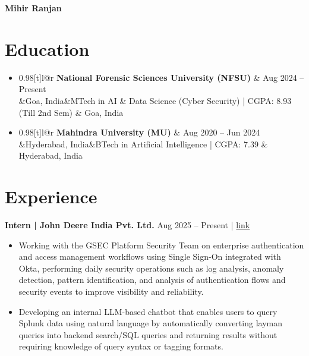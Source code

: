 \documentclass[a4paper,11pt]{article}
\makeatletter
\newcommand{\resumeSubheading}[4]{\vspace{0.5mm}\item
  \begin{tabular*}{0.98\textwidth}[t]{l@{\extracolsep{\fill}}r}
    \textbf{#1} & #4 \\
    \ifx&#2&\else #3 & #2 \\ \fi
  \end{tabular*}
  \vspace{-2mm}
}
\newcommand{\resumeSubHeadingListStart}{\begin{itemize}[leftmargin=*,labelsep=1mm,itemsep=0pt]}
\newcommand{\resumeItemListStart}{\begin{itemize}[leftmargin=*,labelsep=1mm,itemsep=0pt,topsep=2pt]}
\newcommand{\resumeSubHeadingListEnd}{\end{itemize}\vspace{1mm}}
\newcommand{\resumeItemListEnd}{\end{itemize}\vspace{1mm}}
\makeatother
\begin{document}
\begin{center}
    {\Huge\textbf{Mihir Ranjan}}
\end{center}

\begin{center}
\normalsize
{}
\end{center}


\section{\textbf{Education}}
\resumeSubHeadingListStart
\resumeSubheading
{National Forensic Sciences University (NFSU)}{Goa, India}
{MTech in AI \& Data Science (Cyber Security) | CGPA: 8.93 (Till 2nd Sem)}{Aug 2024 -- Present}
\resumeSubheading
{Mahindra University (MU)}{Hyderabad, India}
{BTech in Artificial Intelligence | CGPA: 7.39}{Aug 2020 -- Jun 2024}
\resumeSubHeadingListEnd


\section{\textbf{Experience}}

\textbf{Intern | John Deere India Pvt. Ltd.} \hfill Aug 2025 -- Present |
\href{https://drive.google.com/file/d/1NGKccMNJ6PCJyySXnh-hhefYy7hMsqMX/view?usp=sharing}{link}
\resumeItemListStart
\item Working with the GSEC Platform Security Team on enterprise authentication and access management workflows using Single Sign-On integrated with Okta, performing daily security operations such as log analysis, anomaly detection, pattern identification, and analysis of authentication flows and security events to improve visibility and reliability.
\item Developing an internal LLM-based chatbot that enables users to query Splunk data using natural language by automatically converting layman queries into backend search/SQL queries and returning results without requiring knowledge of query syntax or tagging formats.
\resumeItemListEnd
\end{document}
